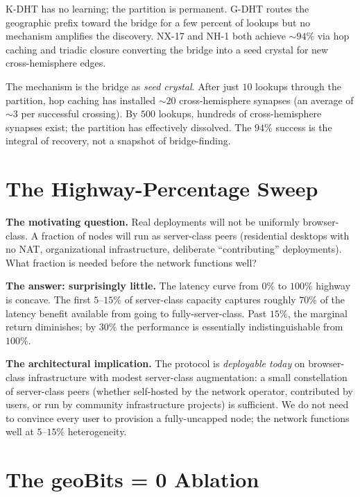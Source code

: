 \documentclass[twoside,nobib]{tufte-book}
\newcommand{\KDHT}{K-DHT\xspace}
\newcommand{\GDHT}{G-DHT\xspace}
\begin{document}
\KDHT has no learning; the partition is permanent. \GDHT routes
the geographic prefix toward the bridge for a few percent of
lookups but no mechanism amplifies the discovery. NX-17 and NH-1
both achieve $\sim 94\%$ via hop caching and triadic closure
converting the bridge into a seed crystal for new
cross-hemisphere edges.

The mechanism is the bridge as \emph{seed crystal}. After just
$10$ lookups through the partition, hop caching has installed
$\sim 20$ cross-hemisphere synapses (an average of $\sim 3$ per
successful crossing). By $500$ lookups, hundreds of
cross-hemisphere synapses exist; the partition has effectively
dissolved. The $94\%$ success is the integral of recovery, not
a snapshot of bridge-finding.

\section{The Highway-Percentage Sweep}

\textbf{The motivating question.} Real deployments will not be
uniformly browser-class. A fraction of nodes will run as
server-class peers (residential desktops with no NAT, organizational
infrastructure, deliberate ``contributing'' deployments). What
fraction is needed before the network functions well?

\textbf{The answer: surprisingly little.} The latency curve from
$0\%$ to $100\%$ highway is concave. The first $5$--$15\%$ of
server-class capacity captures roughly $70\%$ of the latency
benefit available from going to fully-server-class. Past
$15\%$, the marginal return diminishes; by $30\%$ the
performance is essentially indistinguishable from $100\%$.

\textbf{The architectural implication.} The protocol is
\emph{deployable today} on browser-class infrastructure with
modest server-class augmentation: a small constellation of
server-class peers (whether self-hosted by the network operator,
contributed by users, or run by community infrastructure
projects) is sufficient. We do not need to convince every user to
provision a fully-uncapped node; the network functions well at
$5$--$15\%$ heterogeneity.

\section{The geoBits = 0 Ablation}
\end{document}
